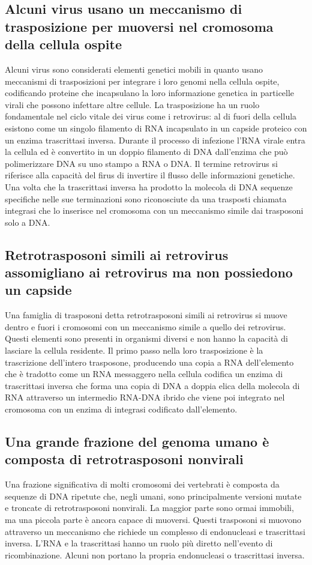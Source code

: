\subsection{Alcuni virus usano un meccanismo di trasposizione per muoversi nel cromosoma della cellula ospite}
Alcuni virus sono considerati elementi genetici mobili in quanto usano meccanismi di trasposizioni per integrare i loro genomi nella cellula ospite, codificando proteine che incapsulano
la loro informazione genetica in particelle virali che possono infettare altre cellule. La trasposizione ha un ruolo fondamentale nel ciclo vitale dei virus come i retrovirus: al di
fuori della cellula esistono come un singolo filamento di RNA incapsulato in un capside proteico con un enzima trascrittasi inversa. Durante il processo di infezione l'RNA virale 
entra la cellula ed \`e convertito in un doppio filamento di DNA dall'enzima che pu\`o polimerizzare DNA su uno stampo a RNA o DNA. Il termine retrovirus si riferisce alla capacit\`a
del firus di invertire il flusso delle informazioni genetiche. Una volta che la trascrittasi inversa ha prodotto la molecola di DNA sequenze specifiche nelle sue terminazioni sono 
riconosciute da una trasposti chiamata integrasi che lo inserisce nel cromosoma con un meccanismo simile dai trasposoni solo a DNA.
\subsection{Retrotrasposoni simili ai retrovirus assomigliano ai retrovirus ma non possiedono un capside}
Una famiglia di trasposoni detta retrotrasposoni simili ai retrovirus si muove dentro e fuori i cromosomi con un meccanismo simile a quello dei retrovirus. Questi elementi sono presenti
in organismi diversi e non hanno la capacit\`a di lasciare la cellula residente. Il primo passo nella loro trasposizione \`e la trascrizione dell'intero trasposone, producendo una 
copia a RNA dell'elemento che \`e tradotto come un RNA messaggero nella cellula codifica un enzima di trascrittasi inversa che forma una copia di DNA a doppia elica della molecola di 
RNA attraverso un intermedio RNA-DNA ibrido che viene poi integrato nel cromosoma con un enzima di integrasi codificato dall'elemento. 
\subsection{Una grande frazione del genoma umano \`e composta di retrotrasposoni nonvirali}
Una frazione significativa di molti cromosomi dei vertebrati \`e composta da sequenze di DNA ripetute che, negli umani, sono principalmente versioni mutate e troncate di retrotrasposoni
nonvirali. La maggior parte sono ormai immobili, ma una piccola parte \`e ancora capace di muoversi. Questi trasposoni si muovono attraverso un meccanismo che richiede un complesso di
endonucleasi e trascrittasi inversa. L'RNA e la trascrittasi hanno un ruolo pi\`u diretto nell'evento di ricombinazione. Alcuni non portano la propria endonucleasi o trascrittasi 
inversa.
